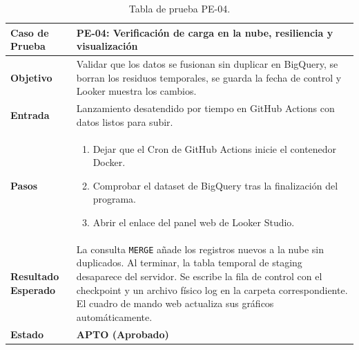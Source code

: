 \begin{table}[p]
	\centering
	\begin{tabularx}{\linewidth}{ p{} X }
		\toprule
		\textbf{Caso de Prueba} & \textbf{PE-04: Verificación de carga en la nube, resiliencia y visualización} \\
		\toprule
		\textbf{Objetivo}       & Validar que los datos se fusionan sin duplicar en BigQuery, se borran los residuos temporales, se guarda la fecha de control y Looker muestra los cambios. \\ \midrule
		\textbf{Entrada}        & Lanzamiento desatendido por tiempo en GitHub Actions con datos listos para subir. \\ \midrule
		\textbf{Pasos}          & 
		\begin{enumerate}
			\tightlist
			\item Dejar que el Cron de GitHub Actions inicie el contenedor Docker.
			\item Comprobar el dataset de BigQuery tras la finalización del programa.
			\item Abrir el enlace del panel web de Looker Studio.
		\end{enumerate} \\ \midrule
		\textbf{Resultado Esperado} & La consulta \texttt{MERGE} añade los registros nuevos a la nube sin duplicados. Al terminar, la tabla temporal de staging desaparece del servidor. Se escribe la fila de control con el checkpoint y un archivo físico log en la carpeta correspondiente. El cuadro de mando web actualiza sus gráficos automáticamente. \\ \midrule
		\textbf{Estado}         & \textbf{APTO (Aprobado)} \\
		\bottomrule
	\end{tabularx}
	\caption{Tabla de prueba PE-04.}
\end{table}


